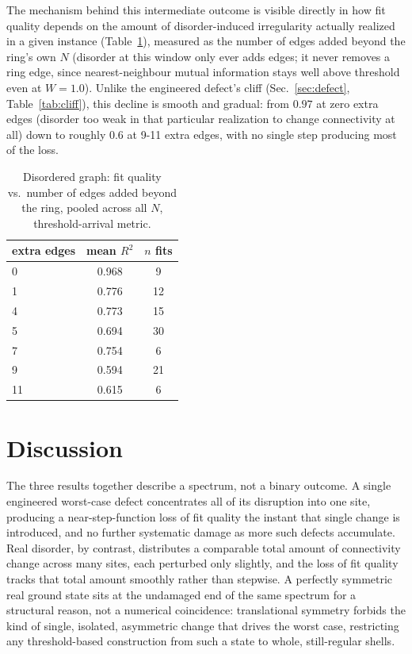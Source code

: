 \documentclass[11pt]{article}
\begin{document}
The mechanism behind this intermediate outcome is visible directly in how fit quality depends on the amount of disorder-induced irregularity actually realized in a given instance (Table~\ref{tab:disorder-mech}), measured as the number of edges added beyond the ring's own $N$ (disorder at this window only ever adds edges; it never removes a ring edge, since nearest-neighbour mutual information stays well above threshold even at $W=1.0$). Unlike the engineered defect's cliff (Sec.~\ref{sec:defect}, Table~\ref{tab:cliff}), this decline is smooth and gradual: from $0.97$ at zero extra edges (disorder too weak in that particular realization to change connectivity at all) down to roughly $0.6$ at 9-11 extra edges, with no single step producing most of the loss.

\begin{table}[h]
\centering
\caption{Disordered graph: fit quality vs.\ number of edges added beyond the ring, pooled across all $N$, threshold-arrival metric.}
\label{tab:disorder-mech}
\begin{tabular}{@{}lcc@{}}
\toprule
extra edges & mean $R^2$ & $n$ fits \\
\midrule
0 & 0.968 & 9 \\
1 & 0.776 & 12 \\
4 & 0.773 & 15 \\
5 & 0.694 & 30 \\
7 & 0.754 & 6 \\
9 & 0.594 & 21 \\
11 & 0.615 & 6 \\
\bottomrule
\end{tabular}
\end{table}

\section{Discussion}
\label{sec:discussion}

The three results together describe a spectrum, not a binary outcome. A single engineered worst-case defect concentrates all of its disruption into one site, producing a near-step-function loss of fit quality the instant that single change is introduced, and no further systematic damage as more such defects accumulate. Real disorder, by contrast, distributes a comparable total amount of connectivity change across many sites, each perturbed only slightly, and the loss of fit quality tracks that total amount smoothly rather than stepwise. A perfectly symmetric real ground state sits at the undamaged end of the same spectrum for a structural reason, not a numerical coincidence: translational symmetry forbids the kind of single, isolated, asymmetric change that drives the worst case, restricting any threshold-based construction from such a state to whole, still-regular shells.
\end{document}
